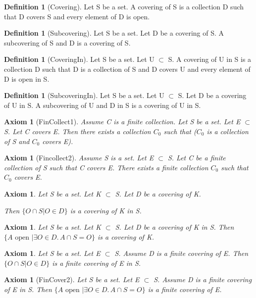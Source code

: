 \documentclass[10pt]{article}
\newenvironment{forthel}{\begin{leftbar}}{\end{leftbar}}
\newcommand{\embed}[2]{ \{ A \text{ open } | \exists O\in #1 .\, A\cap #2 = O\}}
\newcommand{\capcap}[2]{ \{ O\cap #2 | O \in #1 \}}
\newcommand{\var}[2]{ #1_{#2}}
\theoremstyle{definition}
\newtheorem{definition}[theorem]{Definition}
\theoremstyle{plain}
\newtheorem{axiom}[theorem]{Axiom}
\theoremstyle{remark}
\begin{document}
\begin{forthel}
	\begin{definition}[Covering]
		Let S be a set. A covering of S is a collection D such that D covers S and every element of D is open.
	\end{definition}

	\begin{definition}[Subcovering]
		Let S be a set. Let D be a covering of S. A subcovering of S and D is a covering of S.
	\end{definition}
	\begin{definition}[CoveringIn]
		Let S be a set. Let U $\subset$ S. A covering of U in S is a collection D such that D is a collection of S and D covers U and every element of D is open in S.
	\end{definition}

	\begin{definition}[SubcoveringIn]
		Let S be a set. Let U $\subset$ S. Let D be a covering of U in S. A subcovering of U and D in S is a covering of U in S.
	\end{definition}
	
	\begin{axiom}[FinCollect1]
		Assume C is a finite collection. Let S be a set. Let E $\subset$ S. Let C covers E. Then there exists a collection $\var C0$ such that ($\var C0$ is a collection of S and $\var C0$ covers E).
	\end{axiom}
	\begin{axiom}[Fincollect2]
		Assume S is a set. Let E $\subset$ S. Let C be a finite collection of S such that C covers E. There exists a finite collection $\var C0$ such that  $\var C0$ covers E.
	\end{axiom}
	\begin{axiom}
		Let S be a set. Let K $\subset$ S. Let D be a covering of K.

		Then $\capcap{D}{S}$ is a covering of K in S.
	\end{axiom}

	\begin{axiom}
		Let S be a set. Let K $\subset$ S. Let D be a covering of K in S.
		Then $\embed{D}{S}$ is a covering of K.
	\end{axiom}
	\begin{axiom}
		Let S be a set. Let E $\subset$ S. Assume D is a finite covering of E. Then $\capcap{D}{S}$ is a finite covering of E in S.
	\end{axiom}

	\begin{axiom}[FinCover2]
		Let S be a set. Let E $\subset$ S. Assume D is a finite covering of E in S. Then $\embed{D}{S}$ is a finite covering of E.
	\end{axiom}
\end{forthel}
\end{document}
